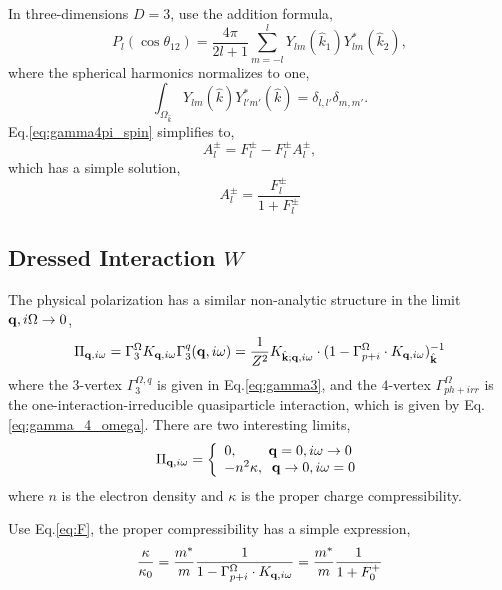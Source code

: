 \documentclass[reprint,amsmath,amssymb,aps,prb]{revtex4-1}
\begin{document}
In three-dimensions $D=3$, use the addition formula,
\begin{equation}
    P_l(\cos\theta_{12})=\frac{4\pi}{2l+1} \sum_{m=-l}^{l} Y_{lm}(\hat{k}_1) Y^*_{lm}(\hat{k}_2),
\end{equation}
where the spherical harmonics normalizes to one,
\begin{equation}
    \int_{\Omega_{\hat{k}}}  Y_{lm}(\hat{k}) Y^*_{l'm'}(\hat{k})=\delta_{l,l'}\delta_{m, m'}.
\end{equation}
Eq.\eqref{eq:gamma4pi_spin} simplifies to,
\begin{equation}
    A_l^\pm=F_l^\pm-F_l^{\pm}A_l^\pm,
\end{equation}
which has a simple solution,
\begin{equation}
    A_l^\pm=\frac{F_l^\pm}{1+F_l^\pm}
\end{equation}

\subsection{Dressed Interaction $W$}

The physical polarization has a similar non-analytic structure in the limit $\mathbf{q}, i\Omega \rightarrow 0$,
\begin{equation}
    \label{eq:polar}
    \Pi_{\mathbf{q}, i\omega}=\Gamma_3^{\Omega}K_{\mathbf{q}, i\omega} \Gamma_3^q(\mathbf{q}, i\omega)=\frac{1}{Z^2}K_{\hat{\mathbf{k}}; \mathbf{q}, i\omega}\cdot(1-\Gamma_{p+i}^\Omega \cdot K_{\mathbf{q}, i\omega})^{-1}_{\hat{\mathbf{k}}}
\end{equation}
where the $3$-vertex $\Gamma_3^{\Omega, q}$ is given in Eq.\eqref{eq:gamma3}, and the $4$-vertex $\Gamma^{\Omega}_{ph+irr}$ is the one-interaction-irreducible quasiparticle interaction, which is given by Eq.\ref{eq:gamma_4_omega}. There are two interesting limits,
\begin{equation}
    \Pi_{\mathbf{q}, i\omega}=\left\{
    \begin{array}{ll}
        0, \;\;\;\;\;\;\;\; \mathbf{q}=0, i\omega \rightarrow 0 \\
        -n^2\kappa, \;\; \mathbf{q}\rightarrow 0, i\omega=0
    \end{array}
    \right.
\end{equation}
where $n$ is the electron density and $\kappa$ is the proper charge compressibility.

Use Eq.\eqref{eq:F}, the proper compressibility has a simple expression,
\begin{equation}
    \frac{\kappa}{\kappa_0}=\frac{m^*}{m}\frac{1}{1-\Gamma_{p+i}^\Omega \cdot K_{\mathbf{q}, i\omega}}=\frac{m^*}{m}\frac{1}{1+F_0^+}
\end{equation}
\end{document}
